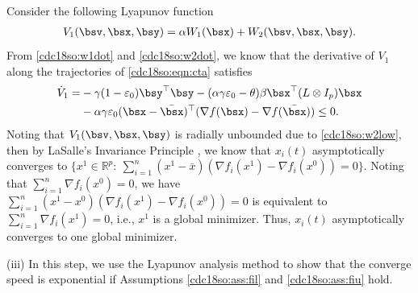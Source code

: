 \documentclass[letterpaper, 10 pt, conference]{ieeeconf}  %
\begin{document}
Consider the following Lyapunov function
\begin{align}\label{cdc18so:v1}
V_1(\bsv,\bsx,\bsy)=\alpha W_1(\bsx)+W_2(\bsv,\bsx,\bsy).
\end{align}
From \eqref{cdc18so:w1dot} and \eqref{cdc18so:w2dot}, we know that the derivative of $V_1$ along the trajectories of \eqref{cdc18so:eqn:cta} satisfies
\begin{align}\label{cdc18so:v1dot}
\dot{V}_1=& -\gamma(1-\varepsilon_0)\bsy^\top \bsy-(\alpha\gamma\varepsilon_0-\theta)\beta \bsx^\top(L\otimes I_p)\bsx\nonumber\\
&-\alpha\gamma\varepsilon_0 (\bsx-\bar{\bsx})^\top(\nabla f(\bsx)-\nabla f(\bar{\bsx}))\le0.
\end{align}
Noting that $V_1(\bsv,\bsx,\bsy)$ is radially unbounded due to \eqref{cdc18so:w2low}, then by LaSalle's Invariance Principle \cite{khalil2002nonlinear},  we know that $x_i(t)$ asymptotically converges to
$\{x^1 \in \mathbb{R}^p:~\sum_{i=1}^n(x^1-\bar{x})(\nabla f_i(x^1)-\nabla f_i(x^0))=0\}$. Noting that $\sum_{i=1}^n\nabla f_i(x^0)=0$, we have $\sum_{i=1}^n(x^1-x^0)(\nabla f_i(x^1)-\nabla f_i(x^0))=0$ is equivalent to $\sum_{i=1}^n\nabla f_i(x^1)=0$, i.e., $x^1$ is a global minimizer. Thus, $x_i(t)$ asymptotically converges to one global minimizer.

(iii) In this step, we use the Lyapunov analysis method to show that the converge speed is exponential if Assumptions \ref{cdc18so:ass:fil} and \ref{cdc18so:ass:fiu} hold.
\end{document}
